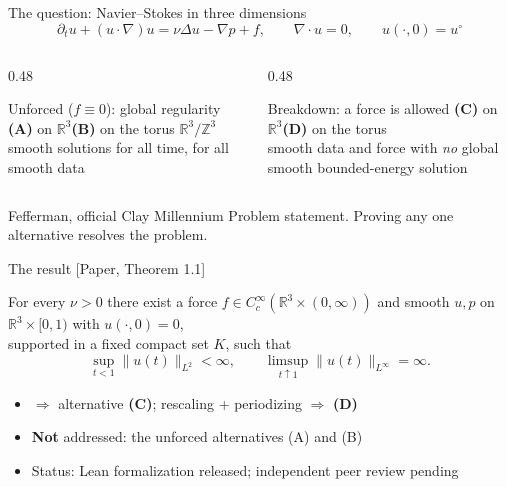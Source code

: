 \documentclass[aspectratio=169,11pt]{beamer}
\newcommand{\R}{\mathbb{R}}
\newcommand{\src}[1]{{\scriptsize\color{accent}\textsf{[#1]}}}
\begin{document}
\begin{frame}{The question: Navier--Stokes in three dimensions}
\[
\partial_t u+(u\cdot\nabla)u=\nu\Delta u-\nabla p+f,\qquad \nabla\cdot u=0,\qquad u(\cdot,0)=u^\circ
\]
\vspace{-2mm}
\begin{columns}[T]
\begin{column}{0.48\textwidth}
\begin{block}{Unforced ($f\equiv0$): global regularity}
\textbf{(A)} on $\R^3$\qquad \textbf{(B)} on the torus $\R^3/\mathbb Z^3$\\[1mm]
\small smooth solutions for all time, for all smooth data
\end{block}
\end{column}
\begin{column}{0.48\textwidth}
\begin{block}{Breakdown: a force is allowed}
\textbf{\color{accent}(C)} on $\R^3$\qquad \textbf{\color{accent}(D)} on the torus\\[1mm]
\small smooth data and force with \emph{no} global smooth bounded-energy solution
\end{block}
\end{column}
\end{columns}
\vspace{3mm}
\centering\small Fefferman, official Clay Millennium Problem statement. Proving any one alternative resolves the problem.
\end{frame}

\begin{frame}{The result \src{Paper, Theorem 1.1}}
\begin{block}{For every $\nu>0$ there exist}
a force $f\in C_c^\infty(\R^3\times(0,\infty))$ and smooth $u,p$ on $\R^3\times[0,1)$ with $u(\cdot,0)=0$,\\
supported in a fixed compact set $K$, such that
\[
\sup_{t<1}\|u(t)\|_{L^2}<\infty,\qquad \limsup_{t\uparrow1}\|u(t)\|_{L^\infty}=\infty .
\]
\end{block}
\begin{itemize}
\item $\Rightarrow$ alternative \textbf{(C)}; rescaling + periodizing $\Rightarrow$ \textbf{(D)}
\item \textbf{Not} addressed: the unforced alternatives (A) and (B)
\item Status: Lean formalization released; independent peer review pending
\end{itemize}
\end{frame}
\end{document}
